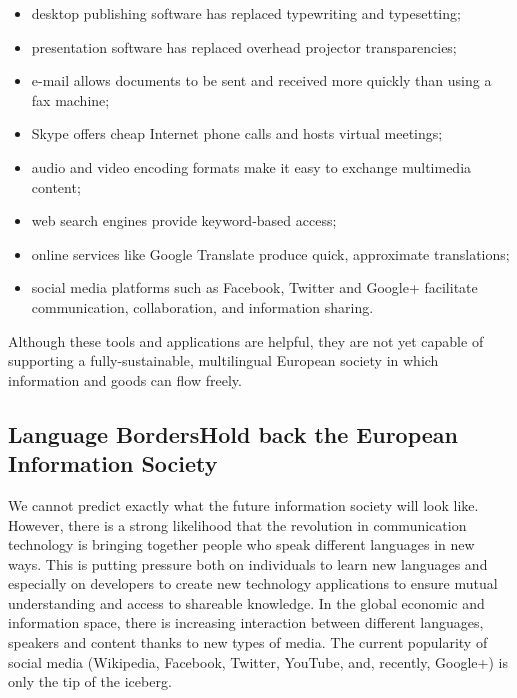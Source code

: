 \begin{multicols}{2}
\begin{itemize}[itemsep=0pt,parsep=0pt]
\item desktop publishing software has replaced typewriting and typesetting;
\item presentation software has replaced overhead projector transparencies;
\item e-mail allows documents to be sent and received more quickly than using a fax machine;
\item Skype offers cheap Internet phone calls and hosts virtual meetings;
\item audio and video encoding formats make it easy to exchange multimedia content;
\item web search engines provide keyword-based access;
\item online services like Google Translate produce quick, approximate translations;
\item social media platforms such as Facebook, Twitter and Google+ facilitate communication, collaboration, and information sharing.
\end{itemize}

Although these tools and applications are helpful, they are not yet capable of supporting a fully-sustainable, multilingual European society in which information and goods can flow freely.

\subsection[Language Borders Hold back the European Information Society]{Language Borders\newline Hold back the European Information Society}

We cannot predict exactly what the future information society will look like. However, there is a strong likelihood that the revolution in communication technology is bringing together people who speak different languages in new ways. This is putting pressure both on individuals to learn new languages and especially on developers to create new technology applications to ensure mutual understanding and access to shareable knowledge. In the global economic and information space, there is increasing interaction between different languages, speakers and content thanks to new types of media. The current popularity of social media (Wikipedia, Facebook, Twitter, YouTube, and, recently, Google+) is only the tip of the iceberg.



\end{multicols}
